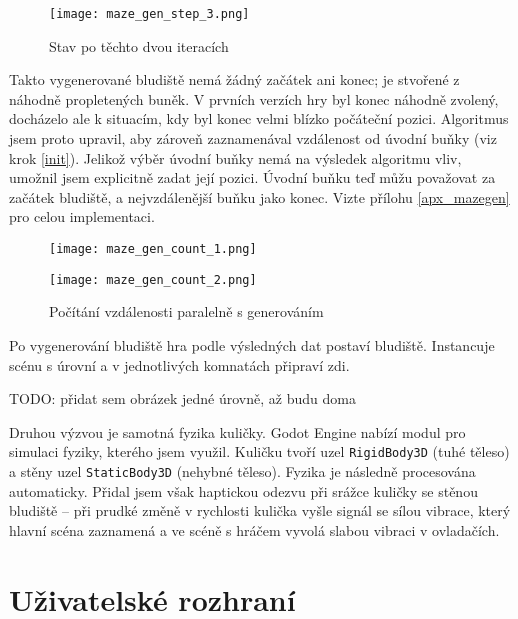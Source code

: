 \begin{figure}[H]
  \centering
  \texttt{[image: maze\_gen\_step\_3.png]}
  \caption{Stav po těchto dvou iteracích}
\end{figure}

Takto vygenerované bludiště nemá žádný začátek ani konec; je stvořené z náhodně propletených buněk. V prvních verzích hry byl konec náhodně zvolený, docházelo ale k situacím, kdy byl konec velmi blízko počáteční pozici. Algoritmus jsem proto upravil, aby zároveň zaznamenával vzdálenost od úvodní buňky (viz krok \ref{init}). Jelikož výběr úvodní buňky nemá na výsledek algoritmu vliv, umožnil jsem explicitně zadat její pozici. Úvodní buňku teď můžu považovat za začátek bludiště, a nejvzdálenější buňku jako konec. Vizte přílohu \ref{apx_mazegen} pro celou implementaci.

\begin{figure}[H]
  \centering

  \begin{minipage}{.5\textwidth}
    \centering
    \texttt{[image: maze\_gen\_count\_1.png]}
  \end{minipage}%
  \begin{minipage}{.5\textwidth}
    \centering
    \texttt{[image: maze\_gen\_count\_2.png]}
  \end{minipage}

  \caption{Počítání vzdálenosti paralelně s generováním}
\end{figure}

Po vygenerování bludiště hra podle výsledných dat postaví bludiště. Instancuje scénu s úrovní a v jednotlivých komnatách připraví zdi.

TODO: přidat sem obrázek jedné úrovně, až budu doma

Druhou výzvou je samotná fyzika kuličky. Godot Engine nabízí modul pro simulaci fyziky, kterého jsem využil. Kuličku tvoří uzel \texttt{RigidBody3D} (tuhé těleso) a stěny uzel \texttt{StaticBody3D} (nehybné těleso). Fyzika je následně procesována automaticky. Přidal jsem však haptickou odezvu při srážce kuličky se stěnou bludiště -- při prudké změně v rychlosti kulička vyšle signál se sílou vibrace, který hlavní scéna zaznamená a ve scéně s hráčem vyvolá slabou vibraci v ovladačích.

\label{uzivatelske_rozhrani}
\section{Uživatelské rozhraní}


